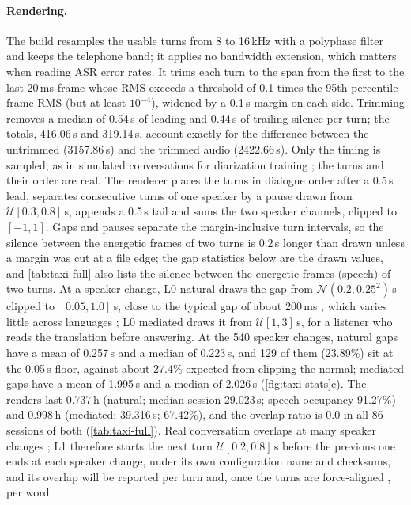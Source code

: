 \paragraph{Rendering.}
The build resamples the usable turns from 8 to 16\,kHz with a polyphase filter and keeps the telephone band; it applies no bandwidth extension, which matters when reading ASR error rates. It trims each turn to the span from the first to the last 20\,ms frame whose RMS exceeds a threshold of 0.1 times the 95th-percentile frame RMS (but at least $10^{-4}$), widened by a 0.1\,s margin on each side. Trimming removes a median of 0.54\,s of leading and 0.44\,s of trailing silence per turn; the totals, 416.06\,s and 319.14\,s, account exactly for the difference between the untrimmed (3157.86\,s) and the trimmed audio (2422.66\,s).
Only the timing is sampled, as in simulated conversations for diarization training \citep{landini2022from}; the turns and their order are real. The renderer places the turns in dialogue order after a 0.5\,s lead, separates consecutive turns of one speaker by a pause drawn from $\mathcal{U}[0.3,0.8]$\,s, appends a 0.5\,s tail and sums the two speaker channels, clipped to $[-1,1]$. Gaps and pauses separate the margin-inclusive turn intervals, so the silence between the energetic frames of two turns is 0.2\,s longer than drawn unless a margin was cut at a file edge; the gap statistics below are the drawn values, and \cref{tab:taxi-full} also lists the silence between the energetic frames (speech) of two turns. At a speaker change, L0 natural draws the gap from $\mathcal{N}(0.2,0.25^2)$\,s clipped to $[0.05,1.0]$\,s, close to the typical gap of about 200\,ms \citep{levinson2015timing}, which varies little across languages \citep{stivers2009universals}; L0 mediated draws it from $\mathcal{U}[1,3]$\,s, for a listener who reads the translation before answering. At the 540 speaker changes, natural gaps have a mean of 0.257\,s and a median of 0.223\,s, and 129 of them (23.89\%) sit at the 0.05\,s floor, against about 27.4\% expected from clipping the normal; mediated gaps have a mean of 1.995\,s and a median of 2.026\,s (\cref{fig:taxi-stats}c). The renders last 0.737\,h (natural; median session 29.023\,s; speech occupancy 91.27\%) and 0.998\,h (mediated; 39.316\,s; 67.42\%), and the overlap ratio is 0.0 in all 86 sessions of both (\cref{tab:taxi-full}). Real conversation overlaps at many speaker changes \citep{heldner2010pauses}; L1 therefore starts the next turn $\mathcal{U}[0.2,0.8]$\,s before the previous one ends at each speaker change, under its own configuration name and checksums, and its overlap will be reported per turn and, once the turns are force-aligned \citep{shi2026qwen3asr}, per word.

